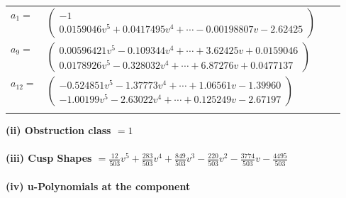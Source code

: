 \documentclass[1p]{elsarticle_modified}
\theoremstyle{definition}
\begin{document}
\begin{tabular}{m{7pt} m{180pt} m{7pt} m{180pt} }
\flushright $a_{1}=$&$\begin{pmatrix}-1\\0.0159046 v^{5}+0.0417495 v^{4}+\cdots-0.00198807 v-2.62425\end{pmatrix}$ \\
\flushright $a_{9}=$&$\begin{pmatrix}0.00596421 v^{5}-0.109344 v^{4}+\cdots+3.62425 v+0.0159046\\0.0178926 v^{5}-0.328032 v^{4}+\cdots+6.87276 v+0.0477137\end{pmatrix}$ \\
\flushright $a_{12}=$&$\begin{pmatrix}-0.524851 v^{5}-1.37773 v^{4}+\cdots+1.06561 v-1.39960\\-1.00199 v^{5}-2.63022 v^{4}+\cdots+0.125249 v-2.67197\end{pmatrix}$\\&\end{tabular}
\flushleft \textbf{(ii) Obstruction class $= 1$}\\~\\
\flushleft \textbf{(iii) Cusp Shapes $= \frac{12}{503} v^5+\frac{283}{503} v^4+\frac{849}{503} v^3-\frac{220}{503} v^2-\frac{3774}{503} v-\frac{4495}{503}$}\\~\\
\newpage\renewcommand{\arraystretch}{1}
\flushleft \textbf{(iv) u-Polynomials at the component}\newline \\
\end{document}

